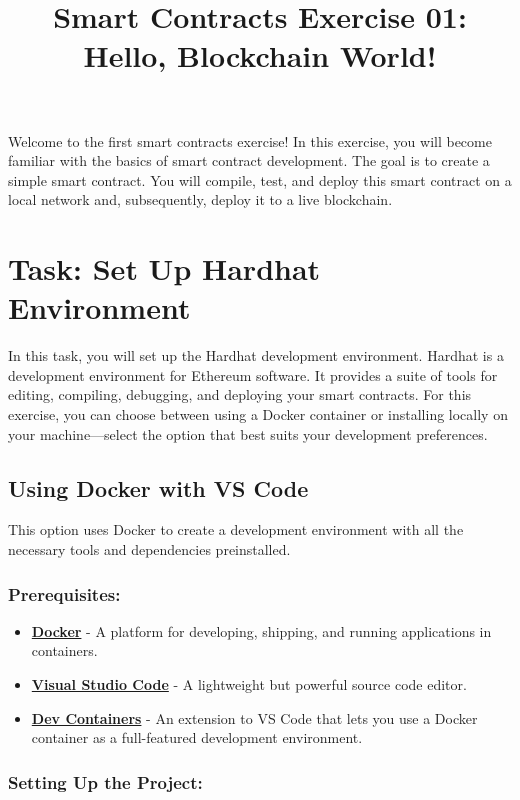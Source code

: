 \documentclass[12pt]{article}
\title{Smart Contracts Exercise 01: \\ Hello, Blockchain World!}
\author{}
\date{}
\begin{document}
\maketitle
\noindent
Welcome to the first smart contracts exercise! In this exercise, you will become familiar with the basics of smart contract development. The goal is to create a simple smart contract. You will compile, test, and deploy this smart contract on a local network and, subsequently, deploy it to a live blockchain.

\section{Task: Set Up Hardhat Environment}

In this task, you will set up the Hardhat development environment. Hardhat is a
development environment for Ethereum software. It provides a suite of tools for
editing, compiling, debugging, and deploying your smart contracts. For this
exercise, you can choose between using a Docker container or installing locally
on your machine—select the option that best suits your development
preferences.

\subsection{Using Docker with VS Code}

This option uses Docker to create a development environment with all the
necessary tools and dependencies preinstalled.

\subsubsection*{Prerequisites:}
\begin{itemize}
    \item \textbf{\href{https://www.docker.com/products/docker-desktop}{Docker}} - A platform for developing, shipping, and running applications in containers.
    \item \textbf{\href{https://code.visualstudio.com/}{Visual Studio Code}} - A lightweight but powerful source code editor.
    \item \textbf{\href{https://marketplace.visualstudio.com/items?itemName=ms-vscode-remote.remote-containers}{Dev Containers}} - An extension to VS Code that lets you use a Docker container as a full-featured development environment.
\end{itemize}

\subsubsection*{Setting Up the Project:}
\end{document}
